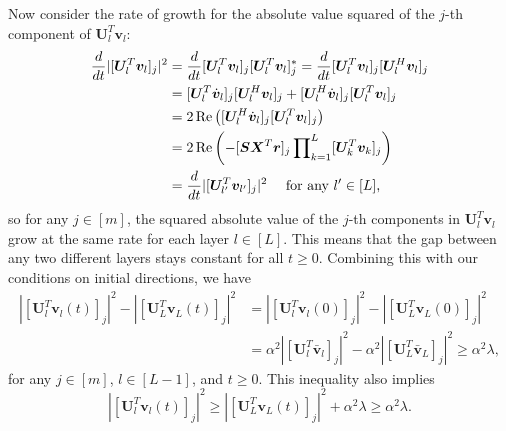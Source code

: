 \documentclass{article} %
\def\vr{{\bm{r}}}
\def\vv{{\bm{v}}}
\def\mS{{\bm{S}}}
\def\mU{{\bm{U}}}
\def\mX{{\bm{X}}}
\renewcommand{\Re}{\mathop{\rm Re}}
\begin{document}
Now consider the rate of growth for the absolute value squared of the $j$-th component of $\mU_l^T \vv_l$:
\begin{align}
    \frac{d}{dt} |[\mU_l^T \vv_l]_j|^2
    &= \frac{d}{dt} [\mU_l^T \vv_l]_j [\mU_l^T \vv_l]_j^*
    = \frac{d}{dt} [\mU_l^T \vv_l]_j [\mU_l^H \vv_l]_j\notag\\
    &= [\mU_l^T \dot \vv_l]_j [\mU_l^H \vv_l]_j
    + [\mU_l^H \dot \vv_l]_j [\mU_l^T \vv_l]_j\notag\\
    &= 2\Re\left ([\mU_l^H \dot \vv_l]_j [\mU_l^T \vv_l]_j \right )\notag\\
    &= 2\Re\left (-[\mS\mX^T \vr]_j \prod\nolimits_{k=1}^L [\mU_k^T \vv_k]_j \right )\notag\\
    &= \frac{d}{dt} |[\mU_{l'}^T \vv_{l'}]_j|^2\quad\text{ for any $l' \in [L]$, }\notag
\end{align}
so for any $j\in [m]$, the squared absolute value of the $j$-th components in $\mU_l^T \vv_l$ grow at the same rate for each layer $l \in [L]$. This means that the gap between any two different layers stays constant for all $t \geq 0$. Combining this with our conditions on initial directions, we have
\begin{equation}
\label{eq:proof-clsf-meta2-11}
\begin{aligned}
    |[\mU_l^T \vv_l(t)]_j|^2 - |[\mU_L^T \vv_L(t)]_j|^2
    &= |[\mU_l^T \vv_l(0)]_j|^2 - |[\mU_L^T \vv_L(0)]_j|^2\\
    &= \alpha^2 |[\mU_l^T \bar \vv_l]_j|^2 - \alpha^2 |[\mU_L^T \bar \vv_L]_j|^2 \geq \alpha^2 \lambda,
\end{aligned}
\end{equation}
for any $j \in [m]$, $l \in [L-1]$, and $t \geq 0$. This inequality also implies
\begin{equation}
\label{eq:proof-clsf-meta2-2}
    |[\mU_l^T \vv_l(t)]_j|^2 
    \geq 
    |[\mU_L^T \vv_L(t)]_j|^2 + \alpha^2 \lambda
    \geq
    \alpha^2 \lambda.
\end{equation}
\end{document}
